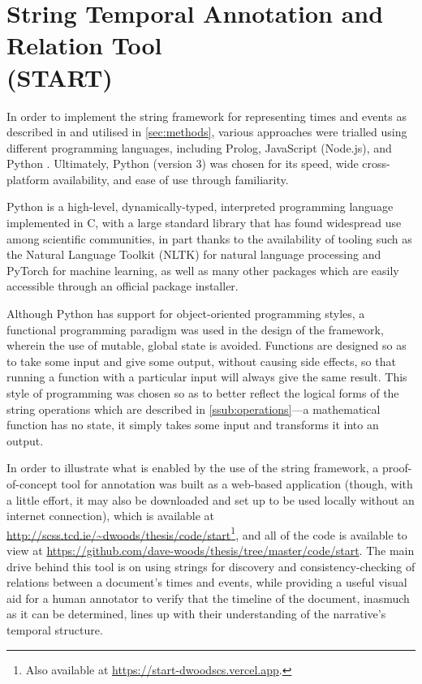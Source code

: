 \documentclass[a4paper,12pt,leqno]{article}
\begin{document}
\newpage
\section[String Temporal Annotation and Relation Tool (START)]{String Temporal Annotation and Relation Tool\\(START)}\label{sec:implementation}
In order to implement the string framework for representing times and events as described in  and utilised in \cref{sec:methods}, various approaches were trialled using different programming languages, including Prolog, JavaScript (Node.js), and Python \citep[see][respectively for more on each]{clocksin2012programming,tilkov2010node,kuhlman2009python}. Ultimately, Python (version 3) was chosen for its speed, wide cross-platform availability, and ease of use through familiarity.

Python is a high-level, dynamically-typed, interpreted programming language implemented in C, with a large standard library that has found widespread use among scientific communities, in part thanks to the availability of tooling such as the Natural Language Toolkit (NLTK) \citep{Bird2009} for natural language processing and PyTorch \citep{ketkar2017introduction} for machine learning, as well as many other packages which are easily accessible through an official package installer.

Although Python has support for object-oriented programming styles, a functional programming paradigm was used in the design of the framework, wherein the use of mutable, global state is avoided. Functions are designed so as to take some input and give some output, without causing side effects, so that running a function with a particular input will always give the same result. This style of programming was chosen so as to better reflect the logical forms of the string operations which are described in \cref{ssub:operations}---a mathematical function has no state, it simply takes some input and transforms it into an output.

In order to illustrate what is enabled by the use of the string framework, a proof-of-concept tool for annotation was built as a web-based application (though, with a little effort, it may also be downloaded and set up to be used locally without an internet connection), which is available at \url{http://scss.tcd.ie/~dwoods/thesis/code/start}\footnote{Also available at \url{https://start-dwoodscs.vercel.app}.}, and all of the code is available to view at \url{https://github.com/dave-woods/thesis/tree/master/code/start}. The main drive behind this tool is on using strings for discovery and consistency-checking of relations between a document's times and events, while providing a useful visual aid for a human annotator to verify that the timeline of the document, inasmuch as it can be determined, lines up with their understanding of the narrative's temporal structure.
\end{document}
